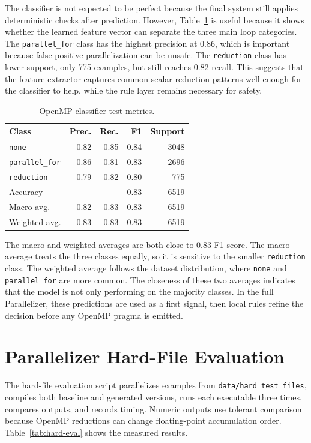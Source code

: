 \documentclass[12pt,a4paper,oneside]{report}
\begin{document}
The classifier is not expected to be perfect because the final system still applies deterministic checks after prediction. However, Table~\ref{tab:classifier} is useful because it shows whether the learned feature vector can separate the three main loop categories. The \texttt{parallel\_for} class has the highest precision at 0.86, which is important because false positive parallelization can be unsafe. The \texttt{reduction} class has lower support, only 775 examples, but still reaches 0.82 recall. This suggests that the feature extractor captures common scalar-reduction patterns well enough for the classifier to help, while the rule layer remains necessary for safety.

\begin{table}[!htbp]
\centering
\caption{OpenMP classifier test metrics.}
\label{tab:classifier}
\normalsize
\begin{tabular}{lrrrr}
\toprule
Class & Prec. & Rec. & F1 & Support \\
\midrule
\texttt{none} & 0.82 & 0.85 & 0.84 & 3048 \\
\texttt{parallel\_for} & 0.86 & 0.81 & 0.83 & 2696 \\
\texttt{reduction} & 0.79 & 0.82 & 0.80 & 775 \\
\midrule
Accuracy & \multicolumn{3}{r}{0.83} & 6519 \\
Macro avg. & 0.82 & 0.83 & 0.83 & 6519 \\
Weighted avg. & 0.83 & 0.83 & 0.83 & 6519 \\
\bottomrule
\end{tabular}
\end{table}

The macro and weighted averages are both close to 0.83 F1-score. The macro average treats the three classes equally, so it is sensitive to the smaller \texttt{reduction} class. The weighted average follows the dataset distribution, where \texttt{none} and \texttt{parallel\_for} are more common. The closeness of these two averages indicates that the model is not only performing on the majority classes. In the full Parallelizer, these predictions are used as a first signal, then local rules refine the decision before any OpenMP pragma is emitted.

\section{Parallelizer Hard-File Evaluation}
The hard-file evaluation script parallelizes examples from \texttt{data/hard\_test\_files}, compiles both baseline and generated versions, runs each executable three times, compares outputs, and records timing. Numeric outputs use tolerant comparison because OpenMP reductions can change floating-point accumulation order. Table~\ref{tab:hard-eval} shows the measured results.
\end{document}
